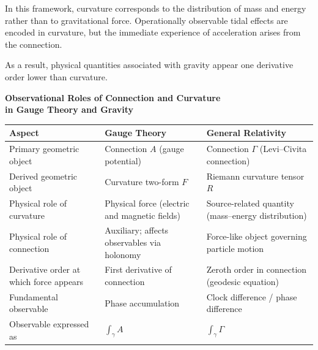 \documentclass[12pt,letterpaper]{article}
\begin{document}
In this framework, curvature corresponds to the distribution of mass and energy rather than to gravitational force. Operationally observable tidal effects are encoded in curvature, but the immediate experience of acceleration arises from the connection.

As a result, physical quantities associated with gravity appear one derivative order lower than curvature.



\begin{table}[t!]
\centering

{\centering
\textbf{Observational Roles of Connection and Curvature\\ in Gauge Theory and Gravity}\par
\vspace{0.4em}
}

\renewcommand{\arraystretch}{1.4}
\begin{tabular}{p{5.0cm}p{5.0cm}p{4.8cm}}
\toprule
\textbf{Aspect} & \textbf{Gauge Theory} & \textbf{General Relativity} \\
\midrule
Primary geometric object
& Connection $A$ (gauge potential)
& Connection $\Gamma$ (Levi--Civita connection) \\

\addlinespace[0.25cm]
Derived geometric object
& Curvature two-form $F$
& Riemann curvature tensor $R$ \\

\addlinespace[0.25cm]
Physical role of curvature
& Physical force (electric and magnetic fields)
& Source-related quantity (mass--energy distribution) \\

\addlinespace[0.25cm]
Physical role of connection
& Auxiliary; affects observables via holonomy
& Force-like object governing particle motion \\

\addlinespace[0.25cm]
Derivative order at which force appears
& First derivative of connection
& Zeroth order in connection (geodesic equation) \\

\addlinespace[0.25cm]
Fundamental observable
& Phase accumulation
& Clock difference / phase difference \\

\addlinespace[0.25cm]
Observable expressed as
& $\displaystyle \int_\gamma A$
& $\displaystyle \int_\gamma \Gamma$ \\


\end{tabular}
\end{table}
\end{document}
